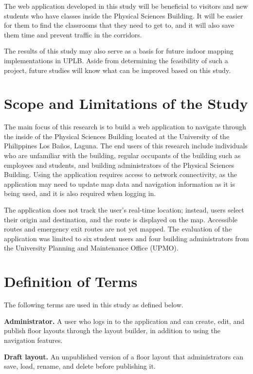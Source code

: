 The web application developed in this study will be beneficial to visitors and
new students who have classes inside the Physical Sciences Building. It will be
easier for them to find the classrooms that they need to get to, and it will
also save them time and prevent traffic in the corridors.

The results of this study may also serve as a basis for future indoor mapping
implementations in UPLB. Aside from determining the feasibility of such a
project, future studies will know what can be improved based on this study.

\section{Scope and Limitations of the Study}\label{sec:1.5}

The main focus of this research is to build a web application to navigate
through the inside of the Physical Sciences Building located at the University
of the Philippines Los Baños, Laguna. The end users of this research include
individuals who are unfamiliar with the building, regular occupants of the
building such as employees and students, and building administrators of the
Physical Sciences Building. Using the application requires access to network
connectivity, as the application may need to update map data and navigation
information as it is being used, and it is also required when logging in.

The application does not track the user's real-time location; instead, users
select their origin and destination, and the route is displayed on the map.
Accessible routes and emergency exit routes are not yet mapped. The evaluation
of the application was limited to six student users and four building
administrators from the University Planning and Maintenance Office (UPMO).

\section{Definition of Terms}\label{sec:1.6}

The following terms are used in this study as defined below.

\textbf{Administrator.} A user who logs in to the application and can create,
edit, and publish floor layouts through the layout builder, in addition to using
the navigation features.

\textbf{Draft layout.} An unpublished version of a floor layout that
administrators can save, load, rename, and delete before publishing it.


